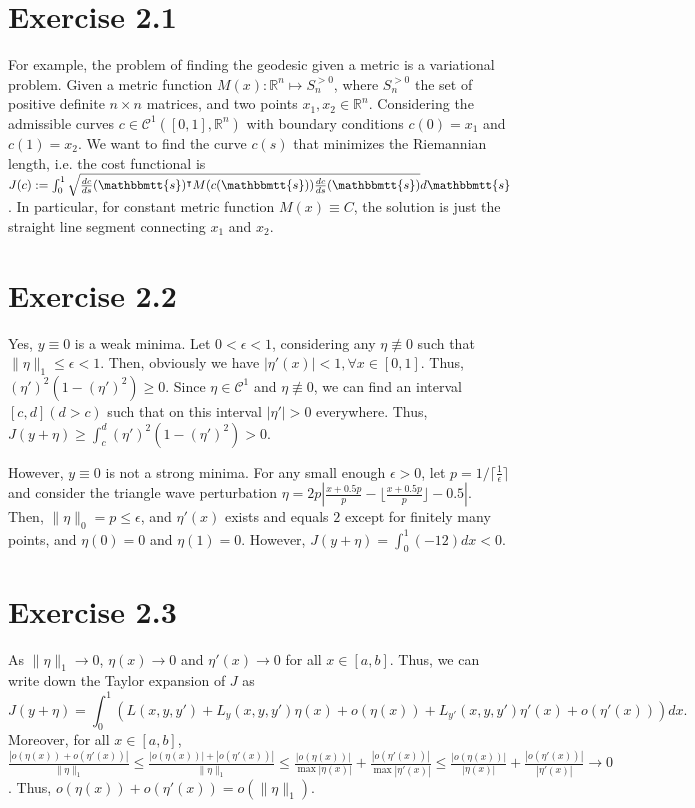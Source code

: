 \documentclass[11pt]{report}
\newcommand{\reals}{\mathbb{R}}
\newcommand{\T}{\intercal}
\begin{document}

\section*{Exercise 2.1}
For example, the problem of finding the geodesic given a metric is a variational problem. Given a metric function $M(x):\reals^n \mapsto S_n^{>0}$, where $S_n^{>0}$ the set of positive definite $n \times n$ matrices, and two points $x_1, x_2 \in \reals^n$. Considering the admissible curves $c \in \mathcal{C}^1([0,1], \reals^n)$ with boundary conditions $c(0) = x_1$ and $c(1) = x_2$. We want to find the curve $c(s)$ that minimizes the Riemannian length, i.e. the cost functional is $J(c) := \int_0^1 \sqrt{\frac{dc}{ds}(\mathbbmtt{s})^\T M(c(\mathbbmtt{s})) \frac{dc}{ds}(\mathbbmtt{s})} d\mathbbmtt{s}$. In particular, for constant metric function $M(x) \equiv C$, the solution is just the straight line segment connecting $x_1$ and $x_2$.
\section*{Exercise 2.2}
Yes, $y \equiv 0$ is a weak minima. Let $0 < \epsilon < 1$, considering any $\eta \not\equiv 0$ such that $\|\eta\|_1 \leq \epsilon < 1$. Then, obviously we have $|\eta'(x)| < 1, \forall x \in [0,1]$. Thus, $(\eta')^2 (1-(\eta')^2) \geq 0$. Since $\eta \in \mathcal{C}^1$ and $\eta \not\equiv 0$, we can find an interval $[c, d] (d>c)$ such that on this interval $|\eta'| > 0$ everywhere. Thus, $J(y + \eta) \geq \int_{c}^{d} (\eta')^2 (1-(\eta')^2) > 0$.

\noindent However, $y \equiv 0$ is not a strong minima. For any small enough $\epsilon > 0$, let $p = 1 / \lceil\frac{1}{\epsilon}\rceil$ and consider the triangle wave perturbation $\eta = 2p \left|\frac{x+0.5p}{p} - \lfloor\frac{x+0.5p}{p}\rfloor - 0.5\right|$. Then, $\|\eta\|_0 = p \leq \epsilon$, and $\eta'(x)$ exists and equals $2$ except for finitely many points, and $\eta(0) = 0$ and $\eta(1) = 0$. However, $J(y+\eta) = \int_0^1(-12)dx < 0$.

\section*{Exercise 2.3}
As $\|\eta\|_1 \to 0$, $\eta(x) \to 0$ and $\eta'(x) \to 0$ for all $x \in [a, b]$. Thus, we can write down the Taylor expansion of $J$ as
\[J(y+\eta) = \int_{0}^{1} \left(L(x,y,y') + L_y(x,y,y')\eta(x) + o(\eta(x)) + L_{y'}(x,y,y')\eta'(x) + o(\eta'(x))\right) dx.\]
Moreover, for all $x \in [a, b]$, $\frac{|o(\eta(x)) + o(\eta'(x))|}{\|\eta\|_1} \leq \frac{|o(\eta(x))| + |o(\eta'(x))|}{\|\eta\|_1} \leq \frac{|o(\eta(x))|}{\max |\eta(x)|} + \frac{|o(\eta'(x))|}{\max |\eta'(x)|} \leq \frac{|o(\eta(x))|}{|\eta(x)|} + \frac{|o(\eta'(x))|}{|\eta'(x)|} \to 0$. Thus, $o(\eta(x)) + o(\eta'(x)) = o(\|\eta\|_1)$.
\end{document}
